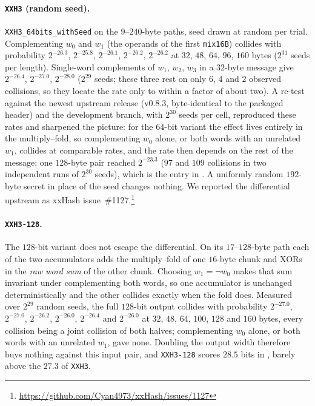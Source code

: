 \paragraph{\texttt{XXH3} (random seed).}
\texttt{XXH3\_64bits\_withSeed} on the $9$--$240$-byte paths, seed drawn at
random per trial.  Complementing $w_0$ and $w_1$ (the operands of the first
\texttt{mix16B}) collides with probability $2^{-26.3}$, $2^{-25.8}$,
$2^{-26.1}$, $2^{-26.2}$, $2^{-26.2}$ at $32$, $48$, $64$, $96$, $160$ bytes
($2^{31}$ seeds per length).  Single-word complements of $w_1$, $w_2$, $w_3$ in
a $32$-byte message give $2^{-26.4}$, $2^{-27.0}$, $2^{-28.0}$ ($2^{29}$
seeds; these three rest on only $6$, $4$ and $2$ observed collisions, so they
locate the rate only to within a factor of about two).  A re-test against the
newest upstream release (v0.8.3, byte-identical to the packaged header) and the
development branch, with $2^{30}$ seeds per cell, reproduced these rates and
sharpened the picture: for the $64$-bit variant the effect lives entirely in
the multiply--fold, so complementing $w_0$ alone, or both words with an
unrelated $w_1$, collides at comparable rates, and the rate then depends on the
rest of the message; one $128$-byte pair reached $2^{-23.3}$ ($97$ and $109$
collisions in two independent runs of $2^{30}$ seeds), which is the entry in
.  A uniformly random $192$-byte secret in
place of the seed changes nothing.  We reported the differential upstream as
xxHash issue~\#1127.\footnote{\url{https://github.com/Cyan4973/xxHash/issues/1127}}

\paragraph{\texttt{XXH3-128}.}
The $128$-bit variant does not escape the differential.  On its $17$--$128$-byte
path each of the two accumulators adds the multiply--fold of one $16$-byte
chunk and XORs in the \emph{raw word sum} of the other chunk.  Choosing
$w_1=\lnot w_0$ makes that sum invariant under complementing both words, so
one accumulator is unchanged deterministically and the other collides exactly
when the fold does.  Measured over $2^{29}$ random seeds, the full $128$-bit
output collides with probability $2^{-27.0}$, $2^{-27.0}$, $2^{-26.2}$,
$2^{-26.0}$, $2^{-26.4}$ and $2^{-26.0}$ at $32$, $48$, $64$, $100$, $128$ and
$160$ bytes, every collision being a joint collision of both halves;
complementing $w_0$ alone, or both words with an unrelated $w_1$, gave none.
Doubling the output width therefore buys nothing against this input pair, and
\texttt{XXH3-128} scores $28.5$ bits in , barely above the $27.3$ of \texttt{XXH3}.

